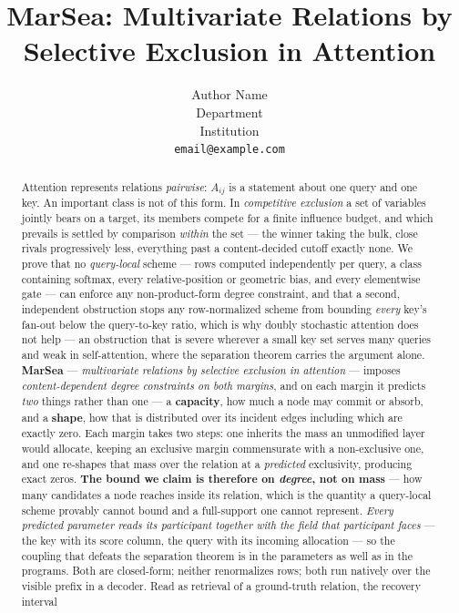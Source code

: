 \documentclass{article}
\title{MarSea: Multivariate Relations by\\Selective Exclusion in Attention}
\author{Author Name \\
Department \\
Institution \\
\texttt{email@example.com}}
\begin{document}
\maketitle

\begin{abstract}
Attention represents relations \emph{pairwise}: $A_{ij}$ is a statement about one query and one
key. An important class is not of this form. In \emph{competitive exclusion} a set of variables
jointly bears on a target, its members compete for a finite influence budget, and which prevails
is settled by comparison \emph{within} the set --- the winner taking the bulk, close rivals
progressively less, everything past a content-decided cutoff exactly none. We prove that no
\emph{query-local} scheme --- rows computed independently per query, a class containing softmax,
every relative-position or geometric bias, and every elementwise gate --- can enforce any
non-product-form degree constraint, and that a second, independent obstruction stops any
row-normalized scheme from bounding \emph{every} key's fan-out below the query-to-key ratio,
which is why doubly stochastic attention does not help --- an obstruction that is severe wherever
a small key set serves many queries and weak in self-attention, where the separation theorem
carries the argument alone. \textbf{MarSea} --- \emph{multivariate relations by selective exclusion in attention} --- imposes
\emph{content-dependent degree constraints on both margins}, and on each margin it predicts
\emph{two} things rather than one --- a \textbf{capacity}, how much a node may commit or absorb,
and a \textbf{shape}, how that is distributed over its incident edges including which are exactly
zero. Each margin takes two steps: one inherits the mass an unmodified layer would allocate,
keeping an exclusive margin commensurate with a non-exclusive one, and one re-shapes that mass
over the relation at a \emph{predicted} exclusivity, producing exact zeros. \textbf{The bound we
claim is therefore on \emph{degree}, not on mass} --- how many candidates a node reaches inside
its relation, which is the quantity a query-local scheme provably cannot bound and a full-support
one cannot represent. \emph{Every predicted
parameter reads its participant together with the field that participant faces} --- the key with
its score column, the query with its incoming allocation --- so the coupling that defeats the
separation theorem is in the parameters as well as in the programs. Both are closed-form; neither
renormalizes rows; both run natively over the
visible prefix in a decoder. Read as retrieval of a ground-truth relation, the recovery interval

\end{abstract}
\end{document}
